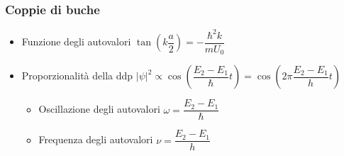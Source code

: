 \documentclass{article}
\begin{document}
\subsubsection{Coppie di buche}
\begin{itemize}
	\item Funzione degli autovalori \( \tan\left( k \dfrac{a}{2} \right) = - \dfrac{\hbar ^2 k}{m U_0} \)
	\item Proporzionalità della ddp \( | \psi | ^ 2 \propto \cos \left( \dfrac{E_2 - E_1}{\hbar} t \right) = \cos \left( 2 \pi \dfrac{E_2 - E_1}{h} t \right)  \)
	\begin{itemize}
		\item Oscillazione degli autovalori \( \omega = \dfrac{E_2 - E_1}{\hbar} \)
		\item Frequenza degli autovalori \( \nu = \dfrac{E_2 - E_1}{h} \)
	\end{itemize}
	
\end{itemize}
\end{document}
